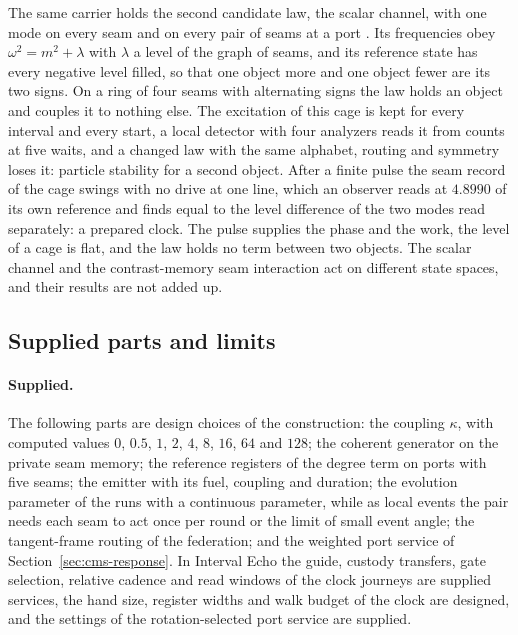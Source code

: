 The same carrier holds the second candidate law, the scalar channel, with one mode on every
seam and on every pair of seams at a port \cite{ophmodel}. Its frequencies obey
$\omega^2=m^2+\lambda$ with $\lambda$ a level of the graph of seams, and its reference state
has every negative level filled, so that one object more and one object fewer are its two
signs. On a ring of four seams with alternating signs the law holds an object and couples
it to nothing else. The excitation of this cage is kept for every interval and every
start, a local detector with four analyzers reads it from counts at five waits, and a
changed law with the same alphabet, routing and symmetry loses it: particle stability for
a second object. After a finite pulse the seam record of the cage swings with no drive at
one line, which an observer reads at $4.8990$ of its own reference and finds equal to the
level difference of the two modes read separately: a prepared clock. The pulse supplies
the phase and the work, the level of a cage is flat, and the law holds no term between two
objects. The scalar channel and the contrast-memory seam interaction act on different
state spaces, and their results are not added up.

\subsection{Supplied parts and limits}
\label{sec:cms-scope}

\paragraph{Supplied.}
The following parts are design choices of the construction: the coupling $\kappa$, with
computed values $0$, $0.5$, $1$, $2$, $4$, $8$, $16$, $64$ and $128$; the coherent generator
on the private seam memory; the reference registers of the degree term on ports with five
seams; the emitter with its fuel, coupling and duration; the evolution parameter of the
runs with a continuous parameter, while as local events the pair needs each seam to act
once per round or the limit of small event angle; the tangent-frame routing of the
federation; and the weighted port service of Section~\ref{sec:cms-response}. In Interval
Echo the guide, custody transfers, gate selection, relative cadence and read windows of
the clock journeys are supplied services, the hand size, register widths and walk budget
of the clock are designed, and the settings of the rotation-selected port service are
supplied.

